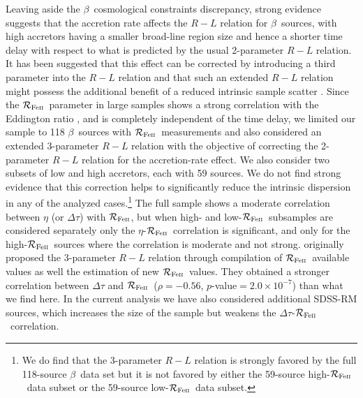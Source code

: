 \documentclass[a4paper,fleqn,usenatbib]{mnras}
\newcommand{\rfe}{${\cal R}_{\rm{Fe\textsc{ii}}}$}
\newcommand{\hb}{{\sc{H}}$\beta$\/}
\begin{document}
Leaving aside the \hb\ cosmological constraints discrepancy, strong evidence suggests that the accretion rate affects the $R-L$ relation for \hb\ sources, with high accretors having a smaller broad-line region size and hence a shorter time delay with respect to what is predicted by the usual 2-parameter $R-L$ relation. It has been suggested that this effect can be corrected by introducing a third parameter into the $R-L$ relation and that such an extended $R-L$ relation might possess the additional benefit of a reduced intrinsic sample scatter \citep{duwang_2019,Mary2020}. Since the \rfe\ parameter in large samples shows a strong correlation with the Eddington ratio \citep[e.g.][]{marziani2003, zamfiretal10}, and is completely independent of the time delay, we limited our sample to 118 \hb\ sources with \rfe\ measurements and also considered an extended 3-parameter $R-L$ relation with the objective of correcting the 2-parameter $R-L$ relation for the accretion-rate effect. We also consider two subsets of low and high accretors, each with 59 sources. We do not find strong evidence that this correction helps to significantly reduce the intrinsic dispersion in any of the analyzed cases.\footnote{We do find that the 3-parameter $R-L$ relation is strongly favored by the full 118-source \hb\ data set but it is not favored by either the 59-source high-\rfe\ data subset or the 59-source low-\rfe\ data subset.} The full sample shows a moderate correlation between $\eta$ (or $\Delta\tau$) with \rfe, but when high- and low-\rfe\ subsamples are considered separately only the $\eta$-\rfe\ correlation is significant, and only for the high-\rfe\ sources where the correlation is moderate and not strong. \citet{duwang_2019} originally proposed the 3-parameter $R-L$ relation through compilation of \rfe\ available values as well the estimation of new \rfe\ values. They obtained a stronger correlation between $\Delta\tau$ and \rfe\ ($\rho=-0.56$, $p$-value$=2.0\times10^{-7}$) than what we find here. In the current analysis we have also considered additional SDSS-RM sources, which increases the size of the sample but weakens the $\Delta \tau$-\rfe\ correlation.  
\end{document}
